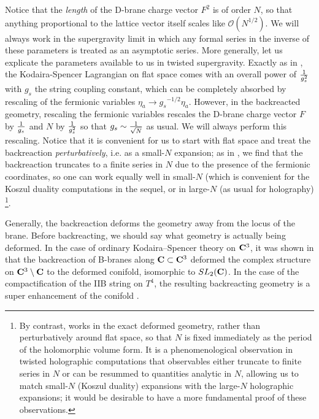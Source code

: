 \documentclass[../main.tex]{subfiles}
\begin{document}
Notice that the \textit{length} of the D-brane charge vector $F^2$ is of order $N$, so that anything proportional to the lattice vector itself scales like $\mathcal{O}(N^{1/2})$. We will always work in the supergravity limit in which any formal series in the inverse of these parameters is treated as an asymptotic series. More generally, let us explicate the parameters available to us in twisted supergravity. Exactly as in \cite{CP}, the Kodaira-Spencer Lagrangian on flat space comes with an overall power of ${1 \over g_s^2}$ with $g_s$ the string coupling constant, which can be completely absorbed by rescaling of the fermionic variables $\eta_a \rightarrow {g_s}^{-1/2}\eta_a$. However, in the backreacted geometry, rescaling the fermionic variables rescales the D-brane charge vector $F$ by ${1 \over g_s}$ and $N$ by ${1 \over g_s^2}$ so that $g_s \sim {1 \over \sqrt{N}}$ as usual. We will always perform this rescaling. Notice that it is convenient for us to start with flat space and treat the backreaction \textit{perturbatively}, i.e. as a small-$N$ expansion; as in \cite{CP}, we find that the backreaction truncates to a finite series in $N$ due to the presence of the fermionic coordinates, so one can work equally well in small-$N$ (which is convenient for the Koszul duality computations in the sequel, or in large-$N$ (as usual for holography) \footnote{By contrast, \cite{CostelloGaiotto} works in the exact deformed geometry, rather than perturbatively around flat space, so that $N$ is fixed immediately as the period of the holomorphic volume form. It is a phenomenological observation in twisted holographic computations that observables either truncate to finite series in $N$ or can be resummed to quantities analytic in $N$, allowing us to match small-$N$ (Koszul duality) expansions with the large-$N$ holographic expansions; it would be desirable to have a more fundamental proof of these observations.}.
 

Generally, the backreaction deforms the geometry away from the locus of the brane. 
Before backreacting, we should say what geometry is actually being deformed. 
In the case of ordinary Kodaira--Spencer theory on $\mathbf{C}^3$, it was shown in \cite{CostelloGaiotto} that the backreaction of B-branes along $\mathbf{C} \subset\mathbf{C}^3$ deformed the complex structure on $\mathbf{C}^3 \setminus \mathbf{C}$ to the deformed conifold, isomorphic to $SL_2(\mathbf{C})$.
In the case of the compactification of the IIB string on $T^4$, the resulting backreacting geometry is a super enhancement of the conifold \cite{CP}. 
\end{document}
